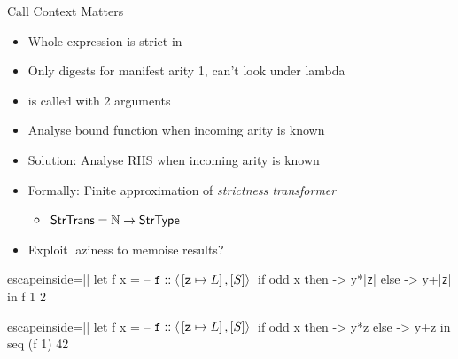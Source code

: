 \documentclass{haskellbeamer}
\begin{document}
\begin{frame}[fragile]{Call Context Matters}
  \begin{overprint}
    \begin{itemize}
      \item Whole expression is strict in 
      \item Only digests  for manifest arity 1, can't look under lambda
      \item {} is called with 2 arguments
      \item<4>[\ding{213}] Analyse bound function when incoming arity is known
    \end{itemize}
    \begin{itemize}
      \item Solution: Analyse RHS when incoming arity is known
      \item Formally: Finite approximation of \emph{strictness transformer}
        \begin{itemize}
          \item $\text{\textsf{StrTrans}} = \mathbb{N} \to \text{\textsf{StrType}}$
        \end{itemize}
      \item Exploit laziness to memoise results?
    \end{itemize}
  \end{overprint}
  \begin{overprint}
    \begin{center}
      \begin{minipage}{0.7\textwidth}
        \begin{haskell*}{escapeinside=||}
          let f x = -- $\mathtt{f} :: \left\langle{}\left[\mathtt{z}\mapsto L\right],[S]\right\rangle{}$
                if odd x
                  then \y -> y*|\color{red}\texttt{z}|
                  else \y -> y+|\color{red}\texttt{z}|
          in f 1 2
        \end{haskell*}
      \end{minipage}
    \end{center}
    \begin{center}
      \begin{minipage}{0.7\textwidth}
        \begin{haskell*}{escapeinside=||}
          let f x = -- $\mathtt{f} :: \left\langle{}\left[\mathtt{z}\mapsto L\right],[S]\right\rangle{}$
                if odd x
                  then \y -> y*z
                  else \y -> y+z
          in seq (f 1) 42
        \end{haskell*}

\end{minipage}
\end{center}
\end{overprint}
\end{frame}
\end{document}
